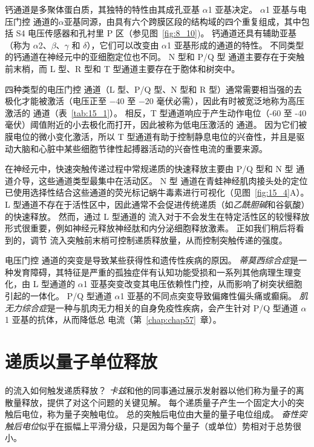 钙通道是多聚体蛋白质，其独特的特性由其成孔亚基 $\alpha$1 亚基决定。
$\alpha$1 亚基与电压门控  通道的$\alpha$亚基同源，由具有六个跨膜区段的结构域的四个重复组成，其中包括 S4 电压传感器和孔衬里 P 区（参见图~\ref{fig:8_10})。
钙通道还具有辅助亚基（称为 $\alpha$2、$\beta$、$\gamma$ 和 $\delta$），它们可以改变由 $\alpha$1 亚基形成的通道的特性。
不同类型的钙通道在神经元中的亚细胞定位也不同。
N 型和 P/Q 型  通道主要存在于突触前末梢，而 L 型、R 型和 T 型通道主要存在于胞体和树突中。


四种类型的电压门控  通道（L 型、P/Q 型、N 型和 R 型）通常需要相当强的去极化才能被激活（电压正至 −40 至 −20 毫伏必需），因此有时被宽泛地称为高压激活的  通道（表~\ref{tab:15_1}）。
相反，T 型通道响应于产生动作电位（-60 至 -40 毫伏）阈值附近的小去极化而打开，因此被称为低电压激活的  通道。
因为它们被膜电位的微小变化激活，所以 T 型通道有助于控制静息电位的兴奋性，并且是驱动大脑和心脏中某些细胞节律性起搏器活动的兴奋性电流的重要来源。


在神经元中，快速突触传递过程中常规递质的快速释放主要由 P/Q 型和 N 型  通道介导，这些通道类型最集中在活动区。
N 型  通道在青蛙神经肌肉接头处的定位已使用选择性结合这些通道的荧光标记蜗牛毒素进行可视化（见图~\ref{fig:15_4}A）。
L 型通道不存在于活性区中，因此通常不会促进传统递质（如\textit{乙酰胆碱}和谷氨酸）的快速释放。
然而，通过 L 型通道的  流入对于不会发生在特定活性区的较慢释放形式很重要，例如神经元释放神经肽和内分泌细胞释放激素。
正如我们稍后将看到的，调节  流入突触前末梢可控制递质释放量，从而控制突触传递的强度。


电压门控  通道的突变是导致某些获得性和遗传性疾病的原因。
\textit{蒂莫西综合症}是一种发育障碍，其特征是严重的孤独症伴有认知功能受损和一系列其他病理生理变化，由 L 型通道的 $\alpha$1 亚基突变改变其电压依赖性门控，从而影响了树突状细胞引起的一体化。
P/Q 型通道 $\alpha$1 亚基的不同点突变导致偏瘫性偏头痛或癫痫。
\textit{肌无力综合症}是一种与肌肉无力相关的自身免疫性疾病，会产生针对 P/Q 型通道 $\alpha$1 亚基的抗体，从而降低总  电流（第~\ref{chap:chap57}~章）。



\section{递质以量子单位释放}

的流入如何触发递质释放？
\textit{卡兹}和他的同事通过展示发射器以他们称为量子的离散量释放，提供了对这个问题的关键见解。
每个递质量子产生一个固定大小的突触后电位，称为量子突触电位。
总的突触后电位由大量的量子电位组成。
\textit{奋性突触后电位}似乎在振幅上平滑分级，只是因为每个量子（或单位）势相对于总势很小。



